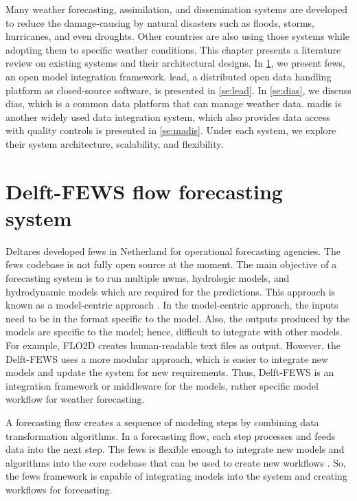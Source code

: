 Many weather forecasting, assimilation, and dissemination systems are developed to reduce the damage-causing by natural disasters such as floods, storms, hurricanes, and even droughts. Other countries are also using those systems while adopting them to specific weather conditions. This chapter presents a literature review on existing systems and their architectural designs. In \cref{se:fews}, we present \acrfull{fews}, an open model integration framework. \acrfull{lead}, a distributed open data handling platform as closed-source software, is presented in \cref{se:lead}. In \cref{se:dias}, we discuss \acrfull{dias}, which is a common data platform that can manage weather data. \acrfull{madis} is another widely used data integration system, which also provides data access with quality controls is presented in \cref{se:madis}. Under each system, we explore their system architecture, scalability, and flexibility.

\section{Delft-FEWS flow forecasting system}
\label{se:fews}

Deltares developed \acrshort{fews} \cite{Werner2013TheSystem} in Netherland for operational forecasting agencies. The \acrshort{fews} codebase is not fully open source at the moment. The main objective of a forecasting system is to run multiple \acrshort{nwm}s, hydrologic models, and hydrodynamic models which are required for the predictions. This approach is known as a model-centric approach \cite{Werner2005FloodCatchments}. In the model-centric approach, the inputs need to be in the format specific to the model. Also, the outputs produced by the models are specific to the model; hence, difficult to integrate with other models. For example, FLO2D creates human-readable text files as output. However, the Delft-FEWS uses a more modular approach, which is easier to integrate new models and update the system for new requirements. Thus, Delft-FEWS is an integration framework or middleware for the models, rather specific model workflow for weather forecasting.

A forecasting flow creates a sequence of modeling steps by combining data transformation algorithms. In a forecasting flow, each step processes and feeds data into the next step. The \acrshort{fews} is flexible enough to integrate new models and algorithms into the core codebase that can be used to create new workflows \cite{Werner2013TheSystem}. So, the \acrshort{fews} framework is capable of integrating models into the system and creating workflows for forecasting.

